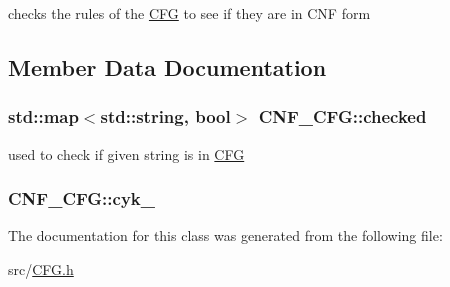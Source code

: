 checks the rules of the \hyperlink{classCFG}{\-C\-F\-G} to see if they are in \-C\-N\-F form 

\subsection{\-Member \-Data \-Documentation}
\hypertarget{classCNF__CFG_ac3b39a62d63d5b0fbedf59456355a1f8}{
\subsubsection[{checked}]{\setlength{\rightskip}{0pt plus 5cm}std\-::map$<$std\-::string, bool$>$ {\bf \-C\-N\-F\-\_\-\-C\-F\-G\-::checked}}}\label{da/d5c/classCNF__CFG_ac3b39a62d63d5b0fbedf59456355a1f8}


used to check if given string is in \hyperlink{classCFG}{\-C\-F\-G} 

\hypertarget{classCNF__CFG_ad8359be441579098a2df2fd979e2f816}{
\subsubsection[{cyk\-\_\-}]{ {\bf \-C\-N\-F\-\_\-\-C\-F\-G\-::cyk\-\_\-}}}\label{da/d5c/classCNF__CFG_ad8359be441579098a2df2fd979e2f816}


\-The documentation for this class was generated from the following file\-:\begin{DoxyCompactItemize}
\item 
src/\hyperlink{CFG_8h}{\-C\-F\-G.\-h}\end{DoxyCompactItemize}
